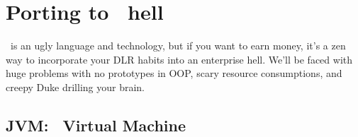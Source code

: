 \part{Porting to \J\ hell}

\J\ is an ugly language and technology, but if you want to earn money, it's a
zen way to incorporate your DLR habits into an enterprise hell. We'll be faced
with huge problems with no prototypes in OOP, scary resource consumptions, and
creepy Duke drilling your brain.

\begin{center}\end{center}

\chapter{JVM: \J\ Virtual Machine}\clearpage





